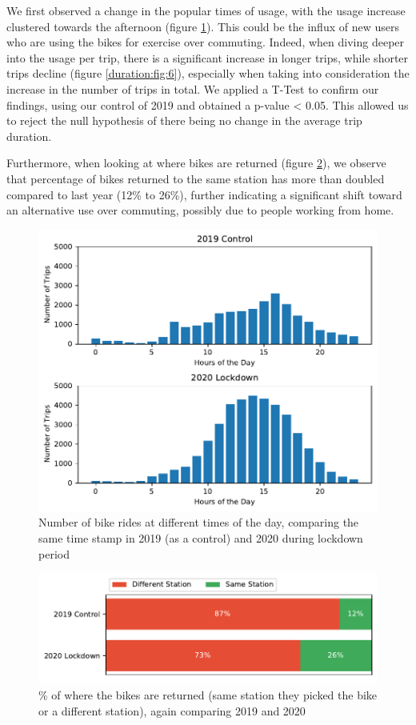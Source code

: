 \documentclass[11pt,a4paper]{article}
\begin{document}
We first observed a change in the popular times of usage, with the usage increase clustered towards the afternoon (figure \ref{time:fig:4}). This could be the influx of new users who are using the bikes for exercise over commuting. Indeed, when diving deeper into the usage per trip, there is a significant increase in longer trips, while shorter trips decline (figure \ref{duration:fig:6}), especially when taking into consideration the increase in the number of trips in total. We applied a T-Test to confirm our findings, using our control of 2019 and obtained a p-value < 0.05. This allowed us to reject the null hypothesis of there being no change in the average trip duration.

Furthermore, when looking at where bikes are returned (figure \ref{returnedbikes:fig:3}), we observe that percentage of bikes returned to the same station has more than doubled compared to last year (12\% to  26\%), further indicating a significant shift toward an alternative use over commuting, possibly due to people working from home.


\begin{figure}[H]
  \centering
  \includegraphics{report/4}
  \caption{Number of bike rides at different times of the day, comparing the same time stamp in 2019 (as a control) and 2020 during lockdown period}
  \label{time:fig:4}
\end{figure}

\begin{figure}[H]
  \centering
  \includegraphics{report/3}
  \caption{\% of where the bikes are returned (same station they picked the bike or a different station), again comparing 2019 and 2020}
  \label{returnedbikes:fig:3}
\end{figure}
\end{document}
